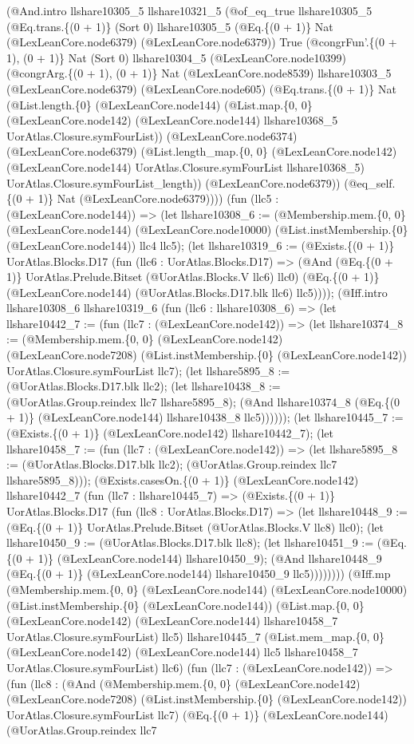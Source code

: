 \documentclass[11pt]{article}
\begin{document}
(@And.intro llshare10305\_5 llshare10321\_5 (@of\_eq\_true llshare10305\_5 (@Eq.trans.\{(0 + 1)\} (Sort 0) llshare10305\_5 (@Eq.\{(0 + 1)\} Nat (@LexLeanCore.node6379) (@LexLeanCore.node6379)) True (@congrFun'.\{(0 + 1), (0 + 1)\} Nat (Sort 0) llshare10304\_5 (@LexLeanCore.node10399) (@congrArg.\{(0 + 1), (0 + 1)\} Nat (@LexLeanCore.node8539) llshare10303\_5 (@LexLeanCore.node6379) (@LexLeanCore.node605) (@Eq.trans.\{(0 + 1)\} Nat (@List.length.\{0\} (@LexLeanCore.node144) (@List.map.\{0, 0\} (@LexLeanCore.node142) (@LexLeanCore.node144) llshare10368\_5 UorAtlas.Closure.symFourList)) (@LexLeanCore.node6374) (@LexLeanCore.node6379) (@List.length\_map.\{0, 0\} (@LexLeanCore.node142) (@LexLeanCore.node144) UorAtlas.Closure.symFourList llshare10368\_5) UorAtlas.Closure.symFourList\_length)) (@LexLeanCore.node6379)) (@eq\_self.\{(0 + 1)\} Nat (@LexLeanCore.node6379)))) (fun (llc5 : (@LexLeanCore.node144)) => (let llshare10308\_6 := (@Membership.mem.\{0, 0\} (@LexLeanCore.node144) (@LexLeanCore.node10000) (@List.instMembership.\{0\} (@LexLeanCore.node144)) llc4 llc5); (let llshare10319\_6 := (@Exists.\{(0 + 1)\} UorAtlas.Blocks.D17 (fun (llc6 : UorAtlas.Blocks.D17) => (@And (@Eq.\{(0 + 1)\} UorAtlas.Prelude.Bitset (@UorAtlas.Blocks.V llc6) llc0) (@Eq.\{(0 + 1)\} (@LexLeanCore.node144) (@UorAtlas.Blocks.D17.blk llc6) llc5)))); (@Iff.intro llshare10308\_6 llshare10319\_6 (fun (llc6 : llshare10308\_6) => (let llshare10442\_7 := (fun (llc7 : (@LexLeanCore.node142)) => (let llshare10374\_8 := (@Membership.mem.\{0, 0\} (@LexLeanCore.node142) (@LexLeanCore.node7208) (@List.instMembership.\{0\} (@LexLeanCore.node142)) UorAtlas.Closure.symFourList llc7); (let llshare5895\_8 := (@UorAtlas.Blocks.D17.blk llc2); (let llshare10438\_8 := (@UorAtlas.Group.reindex llc7 llshare5895\_8); (@And llshare10374\_8 (@Eq.\{(0 + 1)\} (@LexLeanCore.node144) llshare10438\_8 llc5)))))); (let llshare10445\_7 := (@Exists.\{(0 + 1)\} (@LexLeanCore.node142) llshare10442\_7); (let llshare10458\_7 := (fun (llc7 : (@LexLeanCore.node142)) => (let llshare5895\_8 := (@UorAtlas.Blocks.D17.blk llc2); (@UorAtlas.Group.reindex llc7 llshare5895\_8))); (@Exists.casesOn.\{(0 + 1)\} (@LexLeanCore.node142) llshare10442\_7 (fun (llc7 : llshare10445\_7) => (@Exists.\{(0 + 1)\} UorAtlas.Blocks.D17 (fun (llc8 : UorAtlas.Blocks.D17) => (let llshare10448\_9 := (@Eq.\{(0 + 1)\} UorAtlas.Prelude.Bitset (@UorAtlas.Blocks.V llc8) llc0); (let llshare10450\_9 := (@UorAtlas.Blocks.D17.blk llc8); (let llshare10451\_9 := (@Eq.\{(0 + 1)\} (@LexLeanCore.node144) llshare10450\_9); (@And llshare10448\_9 (@Eq.\{(0 + 1)\} (@LexLeanCore.node144) llshare10450\_9 llc5)))))))) (@Iff.mp (@Membership.mem.\{0, 0\} (@LexLeanCore.node144) (@LexLeanCore.node10000) (@List.instMembership.\{0\} (@LexLeanCore.node144)) (@List.map.\{0, 0\} (@LexLeanCore.node142) (@LexLeanCore.node144) llshare10458\_7 UorAtlas.Closure.symFourList) llc5) llshare10445\_7 (@List.mem\_map.\{0, 0\} (@LexLeanCore.node142) (@LexLeanCore.node144) llc5 llshare10458\_7 UorAtlas.Closure.symFourList) llc6) (fun (llc7 : (@LexLeanCore.node142)) => (fun (llc8 : (@And (@Membership.mem.\{0, 0\} (@LexLeanCore.node142) (@LexLeanCore.node7208) (@List.instMembership.\{0\} (@LexLeanCore.node142)) UorAtlas.Closure.symFourList llc7) (@Eq.\{(0 + 1)\} (@LexLeanCore.node144) (@UorAtlas.Group.reindex llc7 
\end{document}
